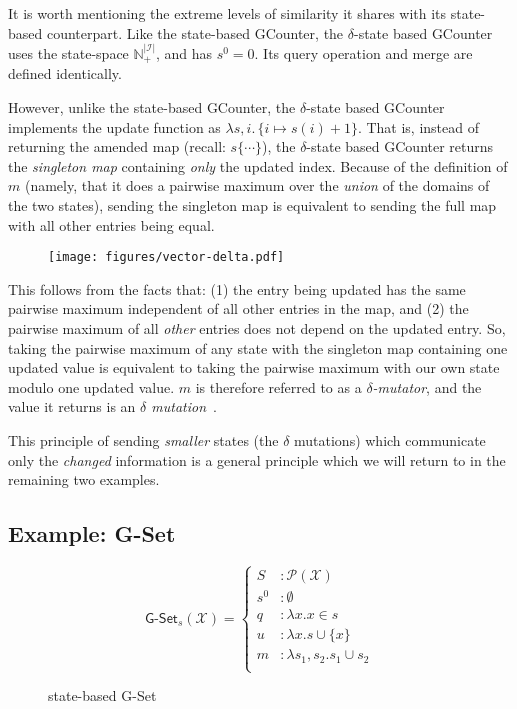 It is worth mentioning the extreme levels of similarity it shares with its
state-based counterpart. Like the state-based GCounter, the $\delta$-state based
GCounter uses the state-space $\mathbb{N}^{|\mathcal{I}|}_+$, and has $s^0 = 0$.
Its query operation and merge are defined identically.

However, unlike the state-based GCounter, the $\delta$-state based GCounter
implements the update function as $\lambda s,i.\, \{ i \mapsto s(i) + 1\}$. That
is, instead of returning the amended map (recall: $s\{ \cdots \}$), the
$\delta$-state based GCounter returns the \emph{singleton map} containing
\emph{only} the updated index. Because of the definition of $m$ (namely, that it
does a pairwise maximum over the \emph{union} of the domains of the two states),
sending the singleton map is equivalent to sending the full map with all other
entries being equal.

\begin{figure}[H]
  \centering
  \texttt{[image: figures/vector-delta.pdf]}
  \caption{}
\end{figure}

This follows from the facts that: (1) the entry being updated has the same
pairwise maximum independent of all other entries in the map, and (2) the
pairwise maximum of all \emph{other} entries does not depend on the updated
entry. So, taking the pairwise maximum of any state with the singleton map
containing one updated value is equivalent to taking the pairwise maximum with
our own state modulo one updated value. $m$ is therefore referred to as a
\emph{$\delta$-mutator}, and the value it returns is an \emph{$\delta$
mutation}~\citep{almedia18}.

This principle of sending \emph{smaller} states (the $\delta$ mutations) which
communicate only the \emph{changed} information is a general principle which
we will return to in the remaining two examples.

\subsection{Example: G-Set}
\label{sec:example-gset}

\begin{figure}[H]
  \centering
  \[
    \textsf{G-Set}_s(\mathcal{X}) = \left\{\begin{aligned}
      S &: \mathcal{P}(\mathcal{X}) \\
      s^0 &: \emptyset \\
      q &: \lambda x. x \in s \\
      u &: \lambda x. s \cup \{ x \} \\
      m &: \lambda s_1, s_2. s_1 \cup s_2 \\
    \end{aligned}\right.
  \]
  \caption{state-based \textsf{G-Set} \CRDT}
\end{figure}

